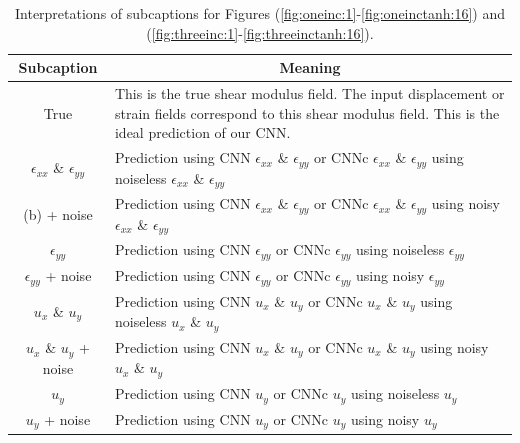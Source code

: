 \documentclass[12pt]{article}
\begin{document}
%
\begin{table}
  \centering
   \begin{tabular}{cp{8cm}}
    \hline
    \multicolumn{1}{|c|}{Subcaption} & \multicolumn{1}{c|}{Meaning}\\
    \hline
    \multicolumn{1}{|c|}{True} & \multicolumn{1}{p{8cm}|}{This is the true shear modulus field. The input displacement or strain fields correspond to this shear modulus field. This is the ideal prediction of our CNN.}\\
    \hline
    \multicolumn{1}{|c|}{$\epsilon_{xx}$ \& $\epsilon_{yy}$} & \multicolumn{1}{p{8cm}|}{Prediction using CNN $\epsilon_{xx}$ \& $\epsilon_{yy}$ or CNNc $\epsilon_{xx}$ \& $\epsilon_{yy}$ using noiseless $\epsilon_{xx}$ \& $\epsilon_{yy}$}\\
    \hline
    \multicolumn{1}{|c|}{(b) + noise} & \multicolumn{1}{p{8cm}|}{Prediction using CNN $\epsilon_{xx}$ \& $\epsilon_{yy}$ or CNNc $\epsilon_{xx}$ \& $\epsilon_{yy}$ using noisy $\epsilon_{xx}$ \& $\epsilon_{yy}$}\\
    \hline
    \multicolumn{1}{|c|}{$\epsilon_{yy}$} & \multicolumn{1}{p{8cm}|}{Prediction using CNN $\epsilon_{yy}$ or CNNc $\epsilon_{yy}$ using noiseless $\epsilon_{yy}$}\\
    \hline
    \multicolumn{1}{|c|}{$\epsilon_{yy}$ + noise} & \multicolumn{1}{p{8cm}|}{Prediction using CNN $\epsilon_{yy}$ or CNNc $\epsilon_{yy}$ using noisy $\epsilon_{yy}$}\\
    \hline
    \multicolumn{1}{|c|}{$u_x$ \& $u_y$} & \multicolumn{1}{p{8cm}|}{Prediction using CNN $u_x$ \& $u_y$ or CNNc $u_x$ \& $u_y$ using noiseless $u_x$ \& $u_y$ }\\
    \hline
    \multicolumn{1}{|c|}{$u_x$ \& $u_y$ + noise} & \multicolumn{1}{p{8cm}|}{Prediction using CNN $u_x$ \& $u_y$ or CNNc $u_x$ \& $u_y$ using noisy $u_x$ \& $u_y$ }\\
    \hline
    \multicolumn{1}{|c|}{$u_y$} & \multicolumn{1}{p{8cm}|}{Prediction using CNN $u_y$ or CNNc $u_y$ using noiseless $u_y$ }\\
    \hline
    \multicolumn{1}{|c|}{$u_y$ + noise} & \multicolumn{1}{p{8cm}|}{Prediction using CNN $u_y$ or CNNc $u_y$ using noisy $u_y$ }\\
    \hline
  \end{tabular}
  \caption{\label{tab:subcap} Interpretations of subcaptions for Figures (\ref{fig:oneinc:1}-\ref{fig:oneinctanh:16}) and (\ref{fig:threeinc:1}-\ref{fig:threeinctanh:16}).}
\end{table}
%
\end{document}

